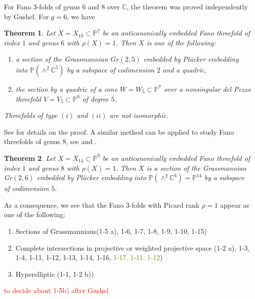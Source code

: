 \documentclass[11pt]{amsart}
\theoremstyle{plain}
\newtheorem{theorem}{Theorem}[section]
\theoremstyle{definition}
\theoremstyle{expl}
\begin{document}
For Fano $3$-folds of genus $6$ and $8$ over $\mathbb{C}$, the theorem was proved independently by Gushel. For $g=6$, we have  
\begin{theorem}
    Let $X=X_{10} \subset \mathbb{P}^7$ be an anticanonically embedded Fano threefold of index $1$ and genus $6$ with $\rho(X)=1$. Then $X$ is one of the following:
    \begin{enumerate}
        \item[(i)] a section of the Grassmannian $Gr(2,5)$ embedded by Pl\"{u}cker embedding into $\mathbb{P}(\wedge^2 \mathbb{C}^5)$ by a subspace of codimension $2$ and a quadric,
        \item[(ii)] the section by a quadric of a cone $W=W_5 \subset\mathbb{P}^7$ over a nonsingular del Pezzo threefold $V= V_5 \subset \mathbb{P}^6$ of degree $5$.
    \end{enumerate}
    Threefolds of type $(i)$ and $(ii)$ are not isomorphic.
\end{theorem}
See \cite{Gus6} for details on the proof.
A similar method can be applied to study Fano threefolds of genus $8$, see \cite{Gus83} and \cite{Gus92}. 
\begin{theorem}
    Let $X=X_{14} \subset \mathbb{P}^9$ be an anticanonically embedded Fano threefold of index $1$ and genus $8$ with $\rho(X)=1$. Then $X$ is a section of the Grassmannian Gr$(2,6)$ embedded by Pl\"{u}cker embedding into $\mathbb{P}(\wedge^2 \mathbb{C}^6) = \mathbb{P}^{14}$ by a subspace of codimension $5$.
\end{theorem}

As a consequence, we see that the Fano $3$-folds with Picard rank $\rho =1$ appear as one of the following: 
\begin{enumerate}
    \item[(i)] Sections of Grassmannians(1-5 a), 1-6, 1-7, 1-8, 1-9, 1-10, 1-15)
    \item[(ii)] Complete intersections in projective or weighted projective space (1-2 a), 1-3, 1-4, 1-11, 1-12, 1-13, 1-14, 1-16, \textcolor{olive}{1-17, 1-11, 1-12})
    \item[(iii)] Hyperelliptic (1-1, 1-2 b))
\end{enumerate}
\textcolor{red}{to decide about 1-5b) after Gushel}
	
	
	
	
	
	
\end{document}
